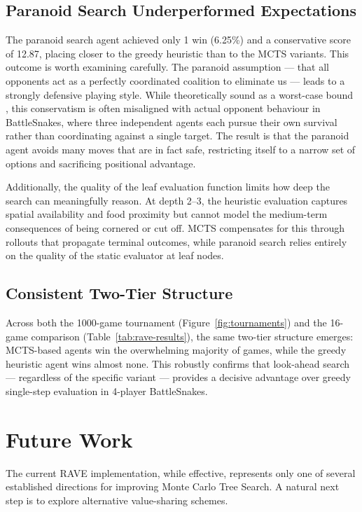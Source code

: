 \documentclass[12pt,a4paper]{article}
\begin{document}
\subsection{Paranoid Search Underperformed Expectations}

The paranoid search agent achieved only 1 win (6.25\%) and a conservative score of 12.87, placing closer to the greedy heuristic than to the MCTS variants. This outcome is worth examining carefully. The paranoid assumption — that all opponents act as a perfectly coordinated coalition to eliminate us — leads to a strongly defensive playing style. While theoretically sound as a worst-case bound \citep{sturtevant2006effective}, this conservatism is often misaligned with actual opponent behaviour in BattleSnakes, where three independent agents each pursue their own survival rather than coordinating against a single target. The result is that the paranoid agent avoids many moves that are in fact safe, restricting itself to a narrow set of options and sacrificing positional advantage.

Additionally, the quality of the leaf evaluation function limits how deep the search can meaningfully reason. At depth 2–3, the heuristic evaluation captures spatial availability and food proximity but cannot model the medium-term consequences of being cornered or cut off. MCTS compensates for this through rollouts that propagate terminal outcomes, while paranoid search relies entirely on the quality of the static evaluator at leaf nodes.

\subsection{Consistent Two-Tier Structure}

Across both the 1000-game tournament (Figure~\ref{fig:tournaments}) and the 16-game comparison (Table~\ref{tab:rave-results}), the same two-tier structure emerges: MCTS-based agents win the overwhelming majority of games, while the greedy heuristic agent wins almost none. This robustly confirms that look-ahead search — regardless of the specific variant — provides a decisive advantage over greedy single-step evaluation in 4-player BattleSnakes.

\section{Future Work}\label{sec:future work}

The current RAVE implementation, while effective, represents only one of several established directions for improving Monte Carlo Tree Search. A natural next step is to explore alternative value-sharing schemes.
\end{document}
